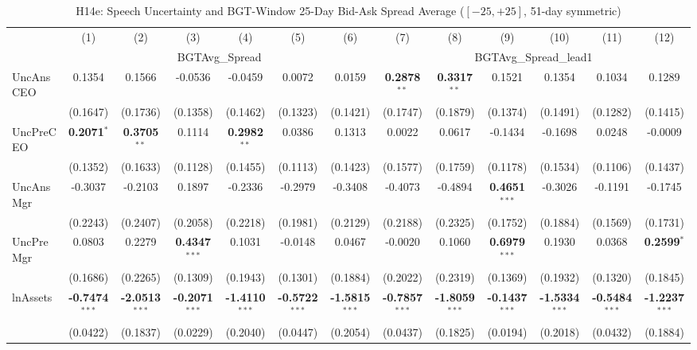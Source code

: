 \begin{landscape}
\begin{table}[H]
\setlength{\tabcolsep}{3pt}
\renewcommand{\arraystretch}{0.85}
\centering
\caption{H14e: Speech Uncertainty and BGT-Window 25-Day Bid-Ask Spread Average ($[-25,+25]$, 51-day symmetric)}
\label{tab:h14e}
\scriptsize
\begin{tabular}{lcccccccccccc}
\toprule
 & (1) & (2) & (3) & (4) & (5) & (6) & (7) & (8) & (9) & (10) & (11) & (12) \\
 & \multicolumn{6}{c}{BGTAvg\_Spread} & \multicolumn{6}{c}{BGTAvg\_Spread\_lead1} \\
\cmidrule(lr){2-7} \cmidrule(lr){8-13}
\midrule
UncAnsCEO & 0.1354 & 0.1566 & -0.0536 & -0.0459 & 0.0072 & 0.0159 & \textbf{0.2878}$^{**}$ & \textbf{0.3317}$^{**}$ & 0.1521 & 0.1354 & 0.1034 & 0.1289 \\
 & (0.1647) & (0.1736) & (0.1358) & (0.1462) & (0.1323) & (0.1421) & (0.1747) & (0.1879) & (0.1374) & (0.1491) & (0.1282) & (0.1415) \\
UncPreCEO & \textbf{0.2071}$^{*}$ & \textbf{0.3705}$^{**}$ & 0.1114 & \textbf{0.2982}$^{**}$ & 0.0386 & 0.1313 & 0.0022 & 0.0617 & -0.1434 & -0.1698 & 0.0248 & -0.0009 \\
 & (0.1352) & (0.1633) & (0.1128) & (0.1455) & (0.1113) & (0.1423) & (0.1577) & (0.1759) & (0.1178) & (0.1534) & (0.1106) & (0.1437) \\
UncAnsMgr & -0.3037 & -0.2103 & 0.1897 & -0.2336 & -0.2979 & -0.3408 & -0.4073 & -0.4894 & \textbf{0.4651}$^{***}$ & -0.3026 & -0.1191 & -0.1745 \\
 & (0.2243) & (0.2407) & (0.2058) & (0.2218) & (0.1981) & (0.2129) & (0.2188) & (0.2325) & (0.1752) & (0.1884) & (0.1569) & (0.1731) \\
UncPreMgr & 0.0803 & 0.2279 & \textbf{0.4347}$^{***}$ & 0.1031 & -0.0148 & 0.0467 & -0.0020 & 0.1060 & \textbf{0.6979}$^{***}$ & 0.1930 & 0.0368 & \textbf{0.2599}$^{*}$ \\
 & (0.1686) & (0.2265) & (0.1309) & (0.1943) & (0.1301) & (0.1884) & (0.2022) & (0.2319) & (0.1369) & (0.1932) & (0.1320) & (0.1845) \\
\midrule
lnAssets & \textbf{-0.7474}$^{***}$ & \textbf{-2.0513}$^{***}$ & \textbf{-0.2071}$^{***}$ & \textbf{-1.4110}$^{***}$ & \textbf{-0.5722}$^{***}$ & \textbf{-1.5815}$^{***}$ & \textbf{-0.7857}$^{***}$ & \textbf{-1.8059}$^{***}$ & \textbf{-0.1437}$^{***}$ & \textbf{-1.5334}$^{***}$ & \textbf{-0.5484}$^{***}$ & \textbf{-1.2237}$^{***}$ \\
 & (0.0422) & (0.1837) & (0.0229) & (0.2040) & (0.0447) & (0.2054) & (0.0437) & (0.1825) & (0.0194) & (0.2018) & (0.0432) & (0.1884) \\

\end{tabular}
\end{table}
\end{landscape}
